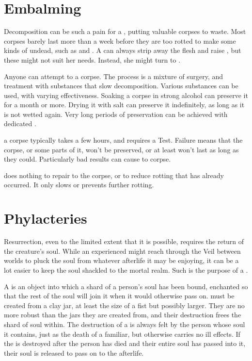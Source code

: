 \section{Embalming}

Decomposition can be such a pain for a , putting valuable corpses to waste.
Most corpses barely last more than a week before they are too rotted to make some kinds of undead, such as  and .
A  can always strip away the flesh and raise , but these might not suit her needs.
Instead, she might turn to {\embalming}.

Anyone can attempt to {\embalm} a corpse.
The process is a mixture of surgery, and treatment with substances that slow decomposition.
Various substances can be used, with varying effectiveness.
Soaking a corpse in strong alcohol can preserve it for a month or more.
Drying it with salt can preserve it indefinitely, as long as it is not wetted again.
Very long periods of preservation can be achieved with dedicated .

{\embalming} a corpse typically takes a few hours, and requires a  Test.
Failure means that the corpse, or some parts of it, won't be preserved, or at least won't last as long as they could.
Particularly bad results can cause {\damage} to corpse.

{\embalming} does nothing to repair {\damage} to the corpse, or to reduce rotting that has already occurred.
It only slows or prevents further rotting.

\section{Phylacteries}

Resurrection, even to the limited extent that it is possible, requires the return of the creature's soul.
While an experienced  might reach through the Veil between worlds to pluck the soul from whatever afterlife it may be enjoying, it can be a lot easier to keep the soul shackled to the mortal realm.
Such is the purpose of a {\phylactery}.

A {\phylactery} is an object into which a shard of a person's soul has been bound, enchanted so that the rest of the soul will join it when it would otherwise pass on.
{\phylacteries} must be created from a clay jar, at least the size of a fist but possibly larger.
They are no more robust than the jars they are created from, and their destruction frees the shard of soul within.
The destruction of a {\phylactery} is always felt by the person whose soul it contains, just as the death of a familiar, but otherwise carries no ill effects.
If the {\phylactery} is destroyed after the person has died and their entire soul has passed into it, their soul is released to pass on to the afterlife.

